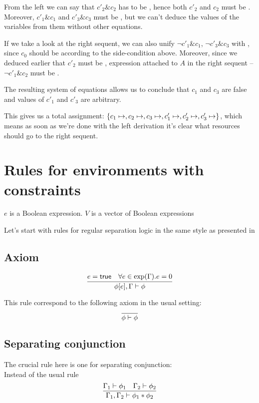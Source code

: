 From the left  we can say that \(c'_2 \& c_2\) has to be \true, hence both \(c'_2\) and \(c_2\) must be \true.
Moreover, \(c'_1 \& c_1\) and \(c'_3 \& c_3\) must be \false, but we can't deduce the values of the variables from them without other equations.

If we take a look at the right sequent, we can also unify \(\neg c'_1 \& c_1\), \(\neg c'_3 \& c_3\) with \false, since \(c_0\) should be \true according to the side-condition above.
Moreover, since we deduced earlier that \(c'_2\) must be \true, expression attached to \(A\) in the right sequent -- \(\neg c'_1 \& c_2\) must be \false.

The resulting system of equations allows us to conclude that \(c_1\) and \(c_3\) are false and values of \(c'_1\) and \(c'_3\) are arbitrary.

This gives us a total assignment: \(\left\{ c_1 \mapsto , c_2 \mapsto , c_3 \mapsto , c'_1 \mapsto , c'_2 \mapsto , c'_3 \mapsto  \right\}\), which means as soon as we're done with the left derivation it's clear what resources should go to the right sequent.
\section{Rules for environments with constraints}

\(e\) is a Boolean expression.
\(V\) is a vector of Boolean expressions

Let's start with rules for regular separation logic in the same style as presented in \citet{harlandResourceDistributionBooleanConstraints2003}

\subsection{Axiom}

\[\infer{\phi[e], \Gamma \vdash \phi}
      {e = \true &
       \forall e \in \expr(\Gamma). e = 0}\]

This rule correspond to the following axiom in the usual setting:
\[\infer{\phi \vdash \phi}{}\]

\subsection{Separating conjunction}

The crucial rule here is one for separating conjunction:\\
Instead of the usual rule
\[\infer{\Gamma_1, \Gamma_2 \vdash \phi_1 \ast \phi_2}
      {\Gamma_1 \vdash \phi_1 &
       \Gamma_2 \vdash \phi_2}\]

